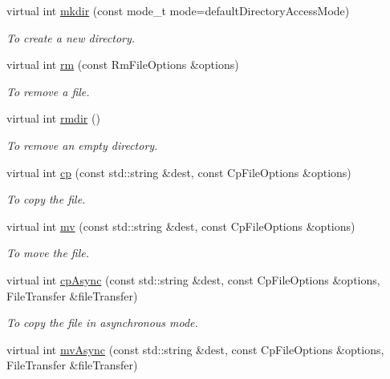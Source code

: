 \begin{DoxyCompactItemize}
virtual int \hyperlink{classLocalFileProxy_aedfb2e624efde94755d2a2e28439f854}{mkdir} (const mode\_\-t mode=defaultDirectoryAccessMode)
\begin{DoxyCompactList}\small\item\em To create a new directory. \item\end{DoxyCompactList}\item 
virtual int \hyperlink{classLocalFileProxy_a547344b53a3220ef9dbb09a7b60abfb6}{rm} (const RmFileOptions \&options)
\begin{DoxyCompactList}\small\item\em To remove a file. \item\end{DoxyCompactList}\item 
virtual int \hyperlink{classLocalFileProxy_a1050955fb8fbe8ff11d2241d3fb66766}{rmdir} ()
\begin{DoxyCompactList}\small\item\em To remove an empty directory. \item\end{DoxyCompactList}\item 
virtual int \hyperlink{classLocalFileProxy_a262f742c0188d1eccd0eb16a2eca72b8}{cp} (const std::string \&dest, const CpFileOptions \&options)
\begin{DoxyCompactList}\small\item\em To copy the file. \item\end{DoxyCompactList}\item 
virtual int \hyperlink{classLocalFileProxy_a698df970e4fdc3fd9b7815fc336eea28}{mv} (const std::string \&dest, const CpFileOptions \&options)
\begin{DoxyCompactList}\small\item\em To move the file. \item\end{DoxyCompactList}\item 
virtual int \hyperlink{classLocalFileProxy_a8edb18eefdde2d0daea34aca515579fb}{cpAsync} (const std::string \&dest, const CpFileOptions \&options, FileTransfer \&fileTransfer)
\begin{DoxyCompactList}\small\item\em To copy the file in asynchronous mode. \item\end{DoxyCompactList}\item 
virtual int \hyperlink{classLocalFileProxy_a66e35fcf3ec9531fd4b085d242d2c9c9}{mvAsync} (const std::string \&dest, const CpFileOptions \&options, FileTransfer \&fileTransfer)

\end{DoxyCompactItemize}
